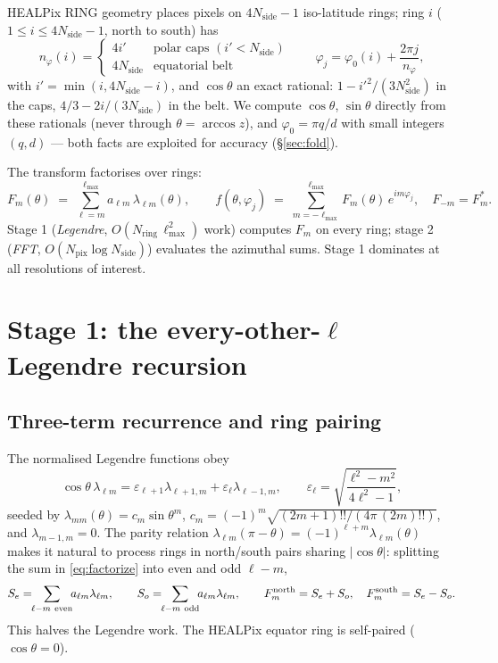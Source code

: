 \documentclass[11pt]{article}
\newcommand{\eps}{\varepsilon}
\newcommand{\lm}{\lambda_{\ell m}}
\newcommand{\cth}{\cos\theta}
\newcommand{\sth}{\sin\theta}
\begin{document}
HEALPix RING geometry places pixels on $4N_\mathrm{side}-1$ iso-latitude
rings; ring $i$ ($1 \le i \le 4N_\mathrm{side}-1$, north to south) has
\begin{equation}
n_\varphi(i) = \begin{cases} 4i' & \text{polar caps } (i' < N_\mathrm{side})\\
4N_\mathrm{side} & \text{equatorial belt} \end{cases}
\qquad
\varphi_j = \varphi_0(i) + \frac{2\pi j}{n_\varphi},
\end{equation}
with $i' = \min(i, 4N_\mathrm{side}-i)$, and $\cth$ an exact rational:
$1 - i'^2/(3N_\mathrm{side}^2)$ in the caps,
$4/3 - 2i/(3N_\mathrm{side})$ in the belt.  We compute $\cth$, $\sth$
directly from these rationals (never through $\theta=\arccos z$), and
$\varphi_0 = \pi q/d$ with small integers $(q,d)$ --- both facts are
exploited for accuracy (\S\ref{sec:fold}).

The transform factorises over rings:
\begin{equation}
F_m(\theta) \;=\; \sum_{\ell=m}^{\ell_{\max}} a_{\ell m}\, \lm(\theta),
\qquad
f(\theta,\varphi_j) \;=\; \sum_{m=-\ell_{\max}}^{\ell_{\max}}
   F_m(\theta)\, e^{im\varphi_j},
\quad F_{-m} = F_m^{*}.
\label{eq:factorize}
\end{equation}
Stage 1 (\emph{Legendre}, $O(N_\mathrm{ring}\,\ell_{\max}^2)$ work) computes
$F_m$ on every ring; stage 2 (\emph{FFT}, $O(N_\mathrm{pix}\log
N_\mathrm{side})$) evaluates the azimuthal sums.  Stage 1 dominates at all
resolutions of interest.

\section{Stage 1: the every-other-$\ell$ Legendre recursion}
\label{sec:legendre}

\subsection{Three-term recurrence and ring pairing}

The normalised Legendre functions obey
\begin{equation}
\cth\, \lm = \eps_{\ell+1}\lambda_{\ell+1,m} + \eps_{\ell}\lambda_{\ell-1,m},
\qquad
\eps_\ell = \sqrt{\frac{\ell^2 - m^2}{4\ell^2 - 1}},
\label{eq:threeterm}
\end{equation}
seeded by $\lambda_{mm}(\theta) = c_m \sth^m$,
$c_m = (-1)^m\sqrt{(2m+1)!!/(4\pi\,(2m)!!)}$, and
$\lambda_{m-1,m}=0$.  The parity relation
$\lm(\pi-\theta) = (-1)^{\ell+m}\lm(\theta)$ makes it natural to process
rings in north/south pairs sharing $|\cth|$: splitting the sum in
\eqref{eq:factorize} into even and odd $\ell-m$,
\begin{equation}
S_e = \!\!\sum_{\ell-m\ \mathrm{even}}\!\! a_{\ell m}\lm, \qquad
S_o = \!\!\sum_{\ell-m\ \mathrm{odd}}\!\! a_{\ell m}\lm, \qquad
F_m^{\rm north} = S_e + S_o,\quad F_m^{\rm south} = S_e - S_o .
\label{eq:evenodd}
\end{equation}
This halves the Legendre work.  The HEALPix equator ring is self-paired
($\cth=0$).
\end{document}
